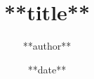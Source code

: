 \documentclass[aspectratio=1610]{beamer}
\title{**title**}
\author{**author**}
\date{**date**}
\begin{document}
\frame{\titlepage}
\end{document}
